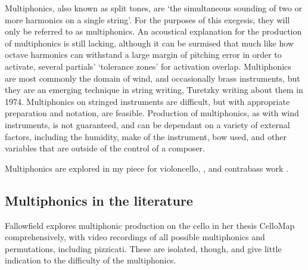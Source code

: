 Multiphonics, also known as split tones, are `the simultaneous sounding of two or more harmonics on a single string'.\autocites[108]{fallowfieldCelloMapHandbook2009}[http://www.cellomap.com/index/the-string/the-left-hand.html]{fallowfieldCelloMap}
For the purposes of this exegesis, they will only be referred to as multiphonics.
An acoustical explanation for the production of multiphonics is still lacking, although it can be surmised that much like how octave harmonics can withstand a large margin of pitching error in order to activate, several partials' `tolerance zones' for activation overlap.\autocites[146]{fallowfieldCelloMapHandbook2009}{bloggsFeedbackContrabassSession2019}
Multiphonics are most commonly the domain of wind, and occasionally brass instruments, but they are an emerging technique in string writing, Turetzky writing about them in 1974.\autocite[138]{turetzkyContemporaryContrabass1974}
Multiphonics on stringed instruments are difficult, but with appropriate preparation and notation, are feasible. 
Production of multiphonics, as with wind instruments, is not guaranteed, and can be dependant on a variety of external factors, including the humidity, make of the instrument, bow used, and other variables that are outside of the control of a composer. 
 


Multiphonics are explored in my piece for violoncello, , and contrabass work .

\subsection{Multiphonics in the literature}

Fallowfield explores multiphonic production on the cello in her thesis CelloMap comprehensively, with video recordings of all possible multiphonics and permutations, including pizzicati.\autocite{fallowfieldCelloMapHandbook2009} 
These are isolated, though, and give little indication to the difficulty of the multiphonics.


